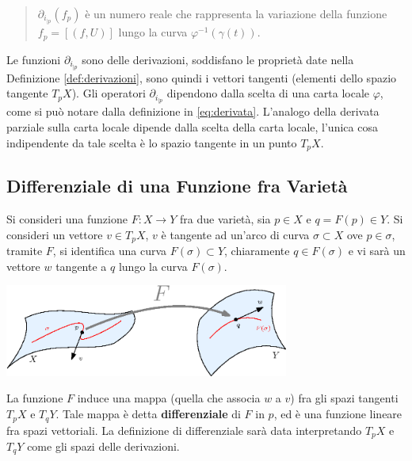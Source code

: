 \documentclass[10pt, letterpaper]{report}
\begin{document}
\begin{quote}
$ \partial_{i_{|p}}(f_p)$ è un numero reale che rappresenta la variazione della funzione $f_p=[(f,U)]$ lungo la curva $\varphi^{-1}(\gamma(t))$.
\end{quote}
Le funzioni $\partial_{i_{|p}}$ sono delle derivazioni, soddisfano le proprietà date nella Definizione \ref{def:derivazioni}, sono quindi i vettori tangenti (elementi dello spazio tangente $T_pX$). Gli operatori $\partial_{i_{|p}}$ dipendono dalla scelta di una carta locale $\varphi$, come si può notare dalla definizione in \eqref{eq:derivata}. L'analogo della derivata parziale sulla carta locale dipende dalla scelta della carta locale, l'unica cosa indipendente da tale scelta è lo spazio tangente in un punto $T_pX$.
\subsection{Differenziale di una Funzione fra Varietà}
Si consideri una funzione $F:X\rightarrow Y$ fra due varietà, sia $p\in X$ e $q=F(p)\in Y$. Si consideri un vettore $v\in T_pX$, $v$ è tangente ad un'arco di curva $\sigma\subset X$ ove $p\in\sigma$, tramite $F$, si identifica una curva $F(\sigma)\subset Y$, chiaramente $q\in F(\sigma)$ e vi sarà un vettore $w$ tangente a $q$ lungo la curva $F(\sigma)$.

\begin{center}
    \includegraphics[width=0.7\textwidth ]{images/differenziale.eps}
\end{center}


\noindent La funzione $F$ induce una mappa (quella che associa $w$ a $v$) fra gli spazi tangenti $T_pX$ e $T_qY$. Tale mappa è detta \textbf{differenziale} di $F$ in $p$, ed è una funzione lineare fra spazi vettoriali. La definizione di differenziale sarà data interpretando $T_pX$ e $T_qY$ come gli spazi delle derivazioni.\bigskip
\end{document}
